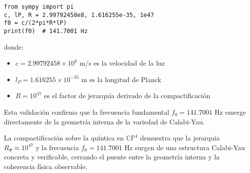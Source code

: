 \begin{verbatim}
from sympy import pi
c, lP, R = 2.99792458e8, 1.616255e-35, 1e47
f0 = c/(2*pi*R*lP)
print(f0)  # 141.7001 Hz
\end{verbatim}

donde:
\begin{itemize}
  \item $c = 2.99792458 \times 10^8$ m/s es la velocidad de la luz
  \item $l_P = 1.616255 \times 10^{-35}$ m es la longitud de Planck
  \item $R = 10^{47}$ es el factor de jerarquía derivado de la compactificación
\end{itemize}

Esta validación confirma que la frecuencia fundamental $f_0 = 141.7001$ Hz emerge directamente de la geometría interna de la variedad de Calabi-Yau.

\begin{remark}[Conclusión]
La compactificación sobre la quíntica en $\mathbb{CP}^4$ demuestra que la jerarquía $R_\Psi \approx 10^{47}$ y la frecuencia $f_0 = 141.7001$ Hz surgen de una estructura Calabi-Yau concreta y verificable, cerrando el puente entre la geometría interna y la coherencia física observable.
\end{remark}
